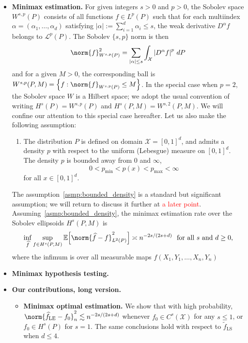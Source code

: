 \documentclass{article}
\newcommand{\abs}[1]{\left \lvert #1 \right \rvert}
\newcommand{\set}[1]{\left\{#1\right\}}
\newcommand{\1}{\mathbf{1}}
\newcommand{\Xset}{\mathcal{X}}
\newcommand{\Leb}{L}
\newcommand{\mc}[1]{\mathcal{#1}}
\newcommand{\Ebb}{\mathbb{E}}
\newcommand{\wt}[1]{\widetilde{#1}}
\newcommand{\wh}[1]{\widehat{#1}}
\newcommand{\LE}{\mathrm{LE}}
\newcommand{\LS}{\mathrm{LS}}
\theoremstyle{alden}
\theoremstyle{aldenthm}
\theoremstyle{definition}
\theoremstyle{remark}
\begin{document}
\begin{itemize}
	\item \textbf{Minimax estimation.} For given integers $s > 0$ and $p > 0$, the Sobolev space $W^{s,p}(P)$ consists of all functions $f \in \Leb^p(P)$ such that for each multiindex $\alpha = (\alpha_1,\ldots,\alpha_d)$ satisfying $\abs{\alpha} := \sum_{i = 1}^{d} \alpha_i \leq s$, the weak derivative $D^{\alpha}f$ belongs to $\mathcal{L}^p(P)$. The Sobolev $\{s,p\}$ norm is then 
	\begin{equation*}
	\norm{f}_{W^{s,p}(P)}^2 = \sum_{\abs{\alpha} \leq s} \int_{\mathcal{X}} \abs{D^{\alpha}f}^p \,dP
	\end{equation*}
	and for a given $M > 0$, the corresponding ball is $W^{s,p}(P, M) = \set{f: \norm{f}_{W^{s,p}(P)} \leq M}$. In the special case when $p = 2$, the Sobolev space $W$ is a Hilbert space; we adopt the usual convention of writing $H^s(P) = W^{s,p}(P)$ and $H^s(P,M) = W^{s,2}(P,M)$. We will confine our attention to this special case hereafter. Let us also make the following assumption:
	\begin{enumerate}[(P1)]
		\item 
		\label{asmp:bounded_density}
		The distribution $P$ is defined on domain $\Xset = [0,1]^d$, and admits a density $p$ with respect to the uniform (Lebesgue) measure on $[0,1]^d$. The density $p$ is bounded away from $0$ and $\infty$,
		\begin{equation*}
		0 < p_{\min} < p(x) < p_{\max} < \infty
		\end{equation*}
		for all $x \in [0,1]^d$.
	\end{enumerate}
	The assumption~\ref{asmp:bounded_density} is a standard but significant assumption; we will return to discuss it further at \textcolor{red}{a later point}. Assuming~\ref{asmp:bounded_density}, the minimax estimation rate over the Sobolev ellipsoids $H^{s}(P,M)$ is
	\begin{equation*}
	\inf_{\wh{f}} \sup_{f \in H^s(P,M)} \Ebb\Bigl[\norm{\wh{f} - f}_{L^2(P)}^2\Bigr] \asymp n^{-2s/(2s + d)}~~\textrm{for all $s$ and $d \geq 0$,}
	\end{equation*}
	where the infimum is over all measurable maps $\wh{f}(X_1,Y_1,\ldots,X_n,Y_n)$
	\item \textbf{Minimax hypothesis testing.}
	\item \textbf{Our contributions, long version.}
	\begin{itemize}
		\item \textbf{Minimax optimal estimation.}
		We show that with high probability,  $\norm{\wh{f}_{\LE} - f_0}_{n}^2 \lesssim n^{-2s/(2s + d)}$ whenever $f_0 \in C^s(\mc{X})$ for any $s \leq 1$, or $f_0 \in H^s(P)$ for $s = 1$. The same conclusions hold with respect to $\wt{f}_{\LS}$ when $d \leq 4$. 

\end{itemize}
\end{itemize}
\end{document}
